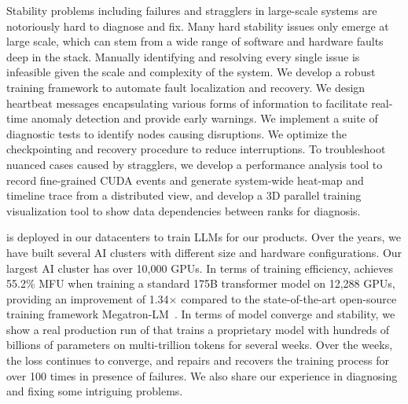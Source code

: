 Stability problems including failures and stragglers in large-scale systems are
notoriously hard to diagnose and fix. Many hard stability issues only emerge at
large scale, which can stem from a wide range of software and hardware faults
deep in the stack. Manually identifying and resolving every single issue is infeasible
given the scale and complexity of the system.  We develop a robust training framework to automate fault
localization and recovery. We design heartbeat messages encapsulating various
forms of information to facilitate real-time anomaly detection and provide
early warnings. We implement a suite of diagnostic tests to identify nodes
causing disruptions. We optimize the checkpointing and recovery procedure to
reduce interruptions. To troubleshoot nuanced cases caused by stragglers, we develop a performance analysis tool to record fine-grained
CUDA events and generate system-wide heat-map and timeline trace from a distributed view, and develop a 3D parallel
training visualization tool to show data dependencies between ranks for diagnosis.


\sysname is deployed in our datacenters to train LLMs for our products. Over the
years, we have built several AI clusters with different size and hardware
configurations. Our largest AI cluster has over 10,000 GPUs. In terms of
training efficiency, \sysname achieves 55.2\% MFU when training a standard 175B
transformer model on 12,288 GPUs, providing an improvement of 1.34$\times$
compared to the state-of-the-art open-source training framework
Megatron-LM~\cite{shoeybi2020megatronlm}. In terms of model converge and
stability,
we show a real production run of \sysname that trains a proprietary
model with hundreds of billions of parameters on multi-trillion tokens for
several weeks. Over the weeks, the loss continues to converge, and \sysname
repairs and recovers the training process for over 100 times in presence of failures.
We also share our experience in diagnosing and fixing some intriguing problems. 
